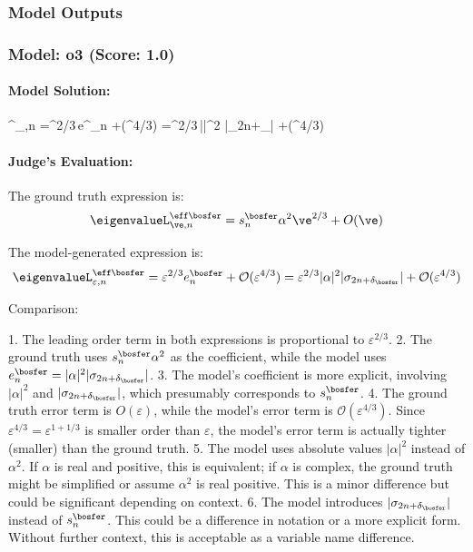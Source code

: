 \documentclass[10pt]{article}
\begin{document}
\subsubsection*{Model Outputs}
\subsubsection*{Model: o3 (Score: 1.0)}
\paragraph*{Model Solution:}
%
\eigenvalueL^{\eff\bosfer}_{\varepsilon,n}
   =\varepsilon^{2/3}\,e^{\bosfer}_{n}
   +(\varepsilon^{4/3})
   =\varepsilon^{2/3}\,|\alpha|^{2}
     \bigl|\sigma_{2n+\delta_{\bosfer}}\bigr|
     +(\varepsilon^{4/3})

\paragraph*{Judge's Evaluation:}

The ground truth expression is:
\[
\eigenvalueL^{\eff\bosfer}_{\ve, n} = s^{\bosfer}_{n}\alpha^2 \ve^{2/3} + O (\ve)
\]

The model-generated expression is:
\[
\eigenvalueL^{\eff\bosfer}_{\varepsilon,n}
   = \varepsilon^{2/3} e^{\bosfer}_{n} + \mathcal{O}(\varepsilon^{4/3})
   = \varepsilon^{2/3} |\alpha|^{2} |\sigma_{2n+\delta_{\bosfer}}| + \mathcal{O}(\varepsilon^{4/3})
\]

Comparison:

1. The leading order term in both expressions is proportional to \(\varepsilon^{2/3}\).
2. The ground truth uses \(s^{\bosfer}_n \alpha^2\) as the coefficient, while the model uses \(e^{\bosfer}_n = |\alpha|^2 |\sigma_{2n+\delta_{\bosfer}}|\).
3. The model's coefficient is more explicit, involving \(|\alpha|^2\) and \(|\sigma_{2n+\delta_{\bosfer}}|\), which presumably corresponds to \(s^{\bosfer}_n\).
4. The ground truth error term is \(O(\varepsilon)\), while the model's error term is \(\mathcal{O}(\varepsilon^{4/3})\). Since \(\varepsilon^{4/3} = \varepsilon^{1 + 1/3}\) is smaller order than \(\varepsilon\), the model's error term is actually tighter (smaller) than the ground truth.
5. The model uses absolute values \(|\alpha|^2\) instead of \(\alpha^2\). If \(\alpha\) is real and positive, this is equivalent; if \(\alpha\) is complex, the ground truth might be simplified or assume \(\alpha^2\) is real positive. This is a minor difference but could be significant depending on context.
6. The model introduces \(|\sigma_{2n+\delta_{\bosfer}}|\) instead of \(s^{\bosfer}_n\). This could be a difference in notation or a more explicit form. Without further context, this is acceptable as a variable name difference.
\end{document}
